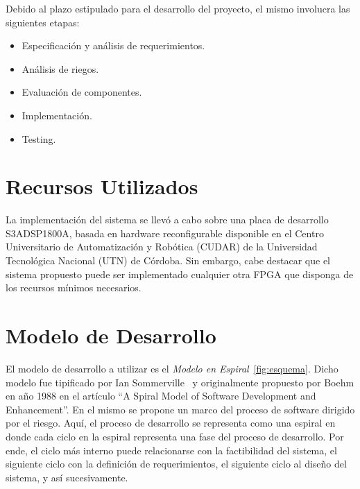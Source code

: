 Debido al plazo estipulado para el desarrollo del proyecto, el mismo
involucra las siguientes etapas:

\begin{itemize}
\item Especificación y análisis de requerimientos.
\item Análisis de riegos.
\item Evaluación de componentes.
\item Implementación.
\item Testing.
\end{itemize}

\section{Recursos Utilizados}

La implementación del sistema se llevó a cabo sobre una placa de
desarrollo S3ADSP1800A, basada en hardware reconfigurable disponible en
el Centro Universitario de Automatización y Robótica (CUDAR) de la
Universidad Tecnológica Nacional (UTN) de Córdoba. Sin embargo, cabe
destacar que el sistema propuesto puede ser implementado cualquier
otra FPGA que disponga de los recursos mínimos necesarios.



\section{Modelo de Desarrollo}
El modelo de desarrollo a utilizar es el \textit{Modelo en
  Espiral}~\ref{fig:esquema}. Dicho modelo fue tipificado por Ian
Sommerville~\cite{Etiqueta00} y originalmente propuesto por Boehm en
año 1988 en el artículo ``A Spiral Model of Software Development and
Enhancement''. En el mismo se propone un marco del proceso de software
dirigido por el riesgo. Aquí, el proceso de desarrollo se representa
como una espiral en donde cada ciclo en la espiral representa una fase
del proceso de desarrollo. Por ende, el ciclo más interno puede
relacionarse con la factibilidad del sistema, el siguiente ciclo con
la definición de requerimientos, el siguiente ciclo al diseño del
sistema, y así sucesivamente.

